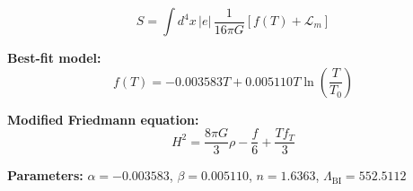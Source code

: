 
\begin{equation}
  S = \int d^4x \, |e| \, \frac{1}{16\pi G} \left[ f(T) + \mathcal{L}_m \right]
\end{equation}

\textbf{Best-fit model:}
\begin{equation}
  f(T) = -0.003583 T + 0.005110 T \ln\!\left(\frac{T}{T_0}\right)
\end{equation}

\textbf{Modified Friedmann equation:}
\begin{equation}
  H^2 = \frac{8\pi G}{3} \rho - \frac{f}{6} + \frac{T f_T}{3}
\end{equation}

\textbf{Parameters:}
$\alpha = -0.003583$, \quad
$\beta = 0.005110$, \quad
$n = 1.6363$, \quad
$\Lambda_{\text{BI}} = 552.5112$